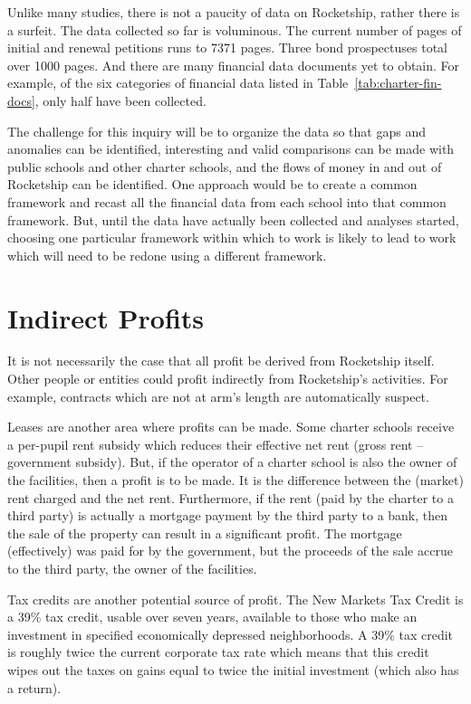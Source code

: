 Unlike many studies, there is not a paucity of data on Rocketship, rather there is a surfeit. The data collected so far is voluminous. The current number of pages of initial and renewal petitions runs to 7371 pages. Three bond prospectuses total over 1000 pages. And there are many financial data documents yet to obtain. For example, of the six categories of financial data listed in Table~\ref{tab:charter-fin-docs}, only half have been collected.

The challenge for this inquiry will be to organize the data so that gaps and anomalies can be identified, interesting and valid comparisons can be made with public schools and other charter schools, and the flows of money in and out of Rocketship can be identified. One approach would be to create a common framework and recast all the financial data from each school into that common framework. But, until the data have actually been collected and analyses started, choosing one particular framework within which to work is likely to lead to work which will need to be redone using a different framework.

\section{Indirect Profits}\label{sec:indirect-profits}\indent

It is not necessarily the case that all profit be derived from Rocketship itself. Other people or entities could profit indirectly from Rocketship's activities. For example, contracts which are not at arm's length are automatically suspect.

Leases are another area where profits can be made. Some charter schools receive a per-pupil rent subsidy which reduces their effective net rent (gross rent – government subsidy). But, if the operator of a charter school is also the owner of the facilities, then a profit is to be made. It is the difference between the (market) rent charged and the net rent.  Furthermore, if the rent (paid by the charter to a third party) is actually a mortgage payment by the third party to a bank, then the sale of the property can result in a significant profit. The mortgage (effectively) was paid for by the government, but the proceeds of the sale accrue to the third party, the owner of the facilities.

Tax credits are another potential source of profit. The New Markets Tax Credit is a 39\% tax credit, usable over seven years, available to those who make an investment in specified economically depressed neighborhoods. A 39\% tax credit is roughly twice the current corporate tax rate which means that this credit wipes out the taxes on gains equal to twice the initial investment (which also has a return). 

